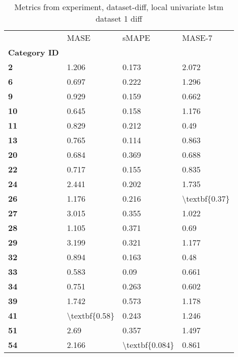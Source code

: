 \begin{table}[h]
\centering
\caption{Metrics from experiment, dataset-diff, local univariate lstm dataset 1 diff}
\label{table:local-univariate-lstm-dataset-1-diff-dataset-diff}
\begin{tabular}{llll}
\toprule
{} &           MASE &           sMAPE &         MASE-7 \\
\textbf{Category ID} &                &                 &                \\
\midrule
\textbf{2          } &          1.206 &           0.173 &          2.072 \\
\textbf{6          } &          0.697 &           0.222 &          1.296 \\
\textbf{9          } &          0.929 &           0.159 &          0.662 \\
\textbf{10         } &          0.645 &           0.158 &          1.176 \\
\textbf{11         } &          0.829 &           0.212 &           0.49 \\
\textbf{13         } &          0.765 &           0.114 &          0.863 \\
\textbf{20         } &          0.684 &           0.369 &          0.688 \\
\textbf{22         } &          0.717 &           0.155 &          0.835 \\
\textbf{24         } &          2.441 &           0.202 &          1.735 \\
\textbf{26         } &          1.176 &           0.216 &  \textbackslash textbf\{0.37\} \\
\textbf{27         } &          3.015 &           0.355 &          1.022 \\
\textbf{28         } &          1.105 &           0.371 &           0.69 \\
\textbf{29         } &          3.199 &           0.321 &          1.177 \\
\textbf{32         } &          0.894 &           0.163 &           0.48 \\
\textbf{33         } &          0.583 &            0.09 &          0.661 \\
\textbf{34         } &          0.751 &           0.263 &          0.602 \\
\textbf{39         } &          1.742 &           0.573 &          1.178 \\
\textbf{41         } &  \textbackslash textbf\{0.58\} &           0.243 &          1.246 \\
\textbf{51         } &           2.69 &           0.357 &          1.497 \\
\textbf{54         } &          2.166 &  \textbackslash textbf\{0.084\} &          0.861 \\
\bottomrule
\end{tabular}
\end{table}
